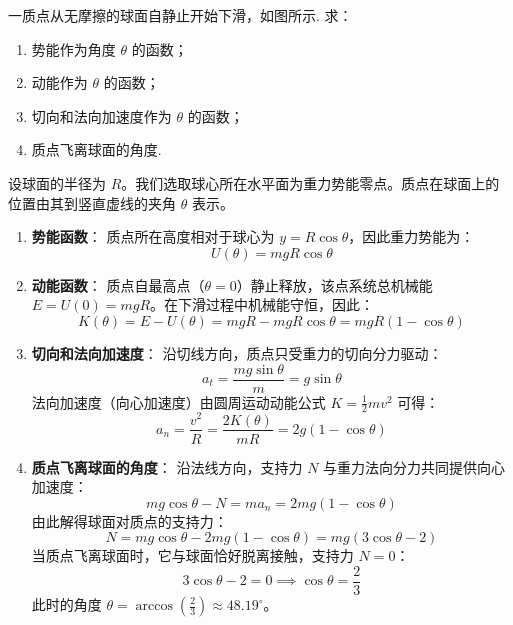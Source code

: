 \begin{exercise}\label{ex:3.12}
一质点从无摩擦的球面自静止开始下滑，如图所示. 求：
\begin{enumerate}
  \item[(a)] 势能作为角度 $\theta$ 的函数；
  \item[(b)] 动能作为 $\theta$ 的函数；
  \item[(c)] 切向和法向加速度作为 $\theta$ 的函数；
  \item[(d)] 质点飞离球面的角度.
\end{enumerate}
\begin{center}
\end{center}
\end{exercise}
\begin{solution}
设球面的半径为 $R$。我们选取球心所在水平面为重力势能零点。质点在球面上的位置由其到竖直虚线的夹角 $\theta$ 表示。

\begin{enumerate}
    \item[(a)] \textbf{势能函数}：
    质点所在高度相对于球心为 $y = R \cos\theta$，因此重力势能为：
    $$ U(\theta) = mgR \cos\theta $$

    \item[(b)] \textbf{动能函数}：
    质点自最高点（$\theta = 0$）静止释放，该点系统总机械能 $E = U(0) = mgR$。在下滑过程中机械能守恒，因此：
    $$ K(\theta) = E - U(\theta) = mgR - mgR \cos\theta = mgR (1 - \cos\theta) $$

    \item[(c)] \textbf{切向和法向加速度}：
    沿切线方向，质点只受重力的切向分力驱动：
    $$ a_t = \frac{mg \sin\theta}{m} = g \sin\theta $$
    法向加速度（向心加速度）由圆周运动动能公式 $K = \frac{1}{2}mv^2$ 可得：
    $$ a_n = \frac{v^2}{R} = \frac{2K(\theta)}{mR} = 2g (1 - \cos\theta) $$

    \item[(d)] \textbf{质点飞离球面的角度}：
    沿法线方向，支持力 $N$ 与重力法向分力共同提供向心加速度：
    $$ mg \cos\theta - N = m a_n = 2mg (1 - \cos\theta) $$
    由此解得球面对质点的支持力：
    $$ N = mg \cos\theta - 2mg (1 - \cos\theta) = mg (3\cos\theta - 2) $$
    当质点飞离球面时，它与球面恰好脱离接触，支持力 $N = 0$：
    $$ 3\cos\theta - 2 = 0 \implies \cos\theta = \frac{2}{3} $$
    此时的角度 $\theta = \arccos\left(\frac{2}{3}\right) \approx 48.19^\circ$。
\end{enumerate}
\end{solution}

